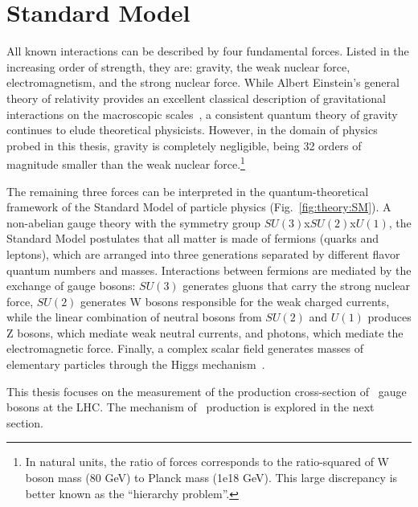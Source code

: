 
\def\sighat{\hat{\sigma}}

\section{Standard Model}

All known interactions can be described by four fundamental forces. Listed in the increasing order of strength, they are: gravity, the weak nuclear force, electromagnetism, and the strong nuclear force. While Albert Einstein's general theory of relativity provides an excellent classical description of gravitational interactions on the macroscopic scales~\cite{GRcite}, a consistent quantum theory of gravity continues to elude theoretical physicists. However, in the domain of physics probed in this thesis, gravity is completely negligible, being 32 orders of magnitude smaller than the weak nuclear force.\footnote{In natural units, the ratio of forces corresponds to the ratio-squared of W boson mass (80 GeV) to Planck mass (1e18 GeV). This large discrepancy is better known as the ``hierarchy problem''.}

The remaining three forces can be interpreted in the quantum-theoretical framework of the Standard Model of particle physics (Fig.~\ref{fig:theory:SM}). A non-abelian gauge theory with the symmetry group $SU(3)$x$SU(2)$x$U(1)$, the Standard Model postulates that all matter is made of fermions (quarks and leptons), which are arranged into three generations separated by different flavor quantum numbers and masses. Interactions between fermions are mediated by the exchange of gauge bosons: $SU(3)$ generates gluons that carry the strong nuclear force, $SU(2)$ generates W bosons responsible for the weak charged currents, while the linear combination of neutral bosons from $SU(2)$ and $U(1)$ produces Z bosons, which mediate weak neutral currents, and photons, which mediate the electromagnetic force. Finally, a complex scalar field generates masses of elementary particles through the Higgs mechanism~\cite{PhysRevLett.13.508}.

This thesis focuses on the measurement of the production cross-section of \Wboson\ gauge bosons at the LHC. The mechanism of \Wboson\ production is explored in the next section.

